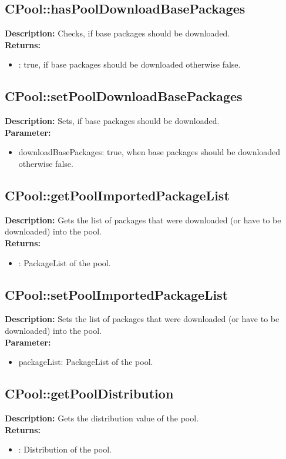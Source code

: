 \subsection{CPool::hasPoolDownloadBasePackages}
\textbf{Description:} Checks, if base packages should be downloaded.\\
\textbf{Returns:}
\begin{itemize}
\item : true, if base packages should be downloaded otherwise false.
\end{itemize}

\subsection{CPool::setPoolDownloadBasePackages}
\textbf{Description:} Sets, if base packages should be downloaded.\\
\textbf{Parameter:}
\begin{itemize}
\item downloadBasePackages: true, when base packages should be downloaded otherwise false.
\end{itemize}

\subsection{CPool::getPoolImportedPackageList}
\textbf{Description:} Gets the list of packages that were downloaded (or have to be downloaded) into the pool.\\
\textbf{Returns:}
\begin{itemize}
\item : PackageList of the pool.
\end{itemize}

\subsection{CPool::setPoolImportedPackageList}
\textbf{Description:} Sets the list of packages that were downloaded (or have to be downloaded) into the pool.\\
\textbf{Parameter:}
\begin{itemize}
\item packageList: PackageList of the pool.
\end{itemize}

\subsection{CPool::getPoolDistribution}
\textbf{Description:} Gets the distribution value of the pool.\\
\textbf{Returns:}
\begin{itemize}
\item : Distribution of the pool.
\end{itemize}

